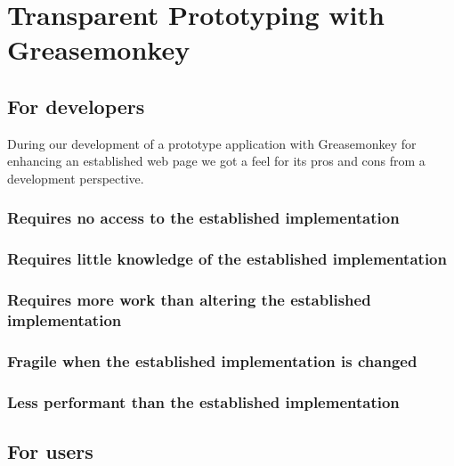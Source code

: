 

\section{Transparent Prototyping with Greasemonkey}

\subsection{For developers}

During our development of a prototype application with Greasemonkey for
enhancing an established web page we got a feel for its pros and cons from a
development perspective.

\subsubsection{Requires no access to the established implementation}

\subsubsection{Requires little knowledge of the established implementation}

\subsubsection{Requires more work than altering the established
  implementation}

\subsubsection{Fragile when the established implementation is changed}

\subsubsection{Less performant than the established implementation}

\subsection{For users}

